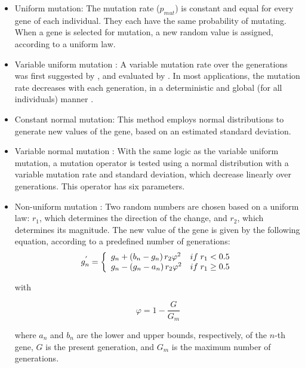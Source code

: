 \documentclass{ametsoc}
\begin{document}
\begin{itemize}
	\item Uniform mutation: The mutation rate ($p_{mut}$) is constant and equal for every gene of each individual. They each have the same probability of mutating. When a gene is selected for mutation, a new random value is assigned, according to a uniform law.
	
	\item Variable uniform mutation \citep{Fogarty1989}: A variable mutation rate over the generations was first suggested by \citet{Holland1992b}, and evaluated by \citet{Fogarty1989}. In most applications, the mutation rate decreases with each generation, in a deterministic and global (for all individuals) manner \citep{Back1992b}. 
	
	\item Constant normal mutation: This method employs normal distributions to generate new values of the gene, based on an estimated standard deviation.
	
	\item Variable normal mutation \citep{Horton2012a}: With the same logic as the variable uniform mutation, a mutation operator is tested using a normal distribution with a variable mutation rate and standard deviation, which decrease linearly over generations. This operator has six parameters.
	
	\item Non-uniform mutation \citep{Michalewicz1996}: Two random numbers are chosen based on a uniform law: $r_{1}$, which determines the direction of the change, and $r_{2}$, which determines its magnitude. The new value of the gene is given by the following equation, according to a predefined number of generations:
	\begin{equation}
	g_{n}^{'} = 
	\left\lbrace \begin{array}{l l} 
	g_{n} + \left(b_{n}-g_{n}\right) r_{2} \varphi^{2} & if \; r_{1} < 0.5 \\
	g_{n} - \left(g_{n}-a_{n}\right) r_{2} \varphi^{2} & if \; r_{1} \geq 0.5 \\
	\end{array} \right.
	\label{eq:nonuniform_mutation}
	\end{equation}
	
	with 
	
	\begin{equation}
	\varphi = 1 - \dfrac{G}{G_{m}}
	\end{equation}
	
	where $a_{n}$ and $b_{n}$ are the lower and upper bounds, respectively, of the $n$-th gene, $G$ is the present generation, and $G_{m}$ is the maximum number of generations.
	

\end{itemize}
\end{document}
